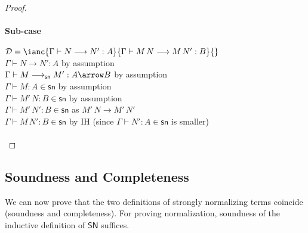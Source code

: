 \documentclass{article}
\newcommand{\C}{\mathcal{C}}
\newcommand{\SN}{\mathsf{SN}}
\newcommand{\csn}{\mathsf{sn}}
\newcommand{\mred}{\longrightarrow^*}
\newcommand{\red}{\longrightarrow}
\newcommand{\redsn}{\longrightarrow_\csn}
\begin{document}
\begin{proof}
\paragraph{Sub-case} $\mathcal{D} = \ianc{\Gamma \vdash N \red N' : A}{\Gamma \vdash M\,N \red M\,N': B}{}$
\\[1em]
$\Gamma \vdash N \red N' : A $ \hfill by assumption \\
$\Gamma \vdash M \redsn M' : A \arrow B$ \hfill by assumption \\
$\Gamma \vdash M: A \in \csn$ \hfill  by assumption\\
$\Gamma \vdash M'\,N : B \in \csn$ \hfill by assumption\\
$\Gamma \vdash M'\,N': B \in \csn$ \hfill as $M'\,N \red M'\,N'$\\
$\Gamma \vdash M\,N' : B \in \csn$ \hfill by IH (since $\Gamma \vdash N': A \in \csn$ is smaller) \\
\\[0.5em]







\end{proof}

\subsection{Soundness and Completeness}
We can now prove that the two definitions of strongly normalizing terms coincide (soundness and completeness).
For proving normalization, soundness of the inductive definition of $\SN$ suffices.
\end{document}
